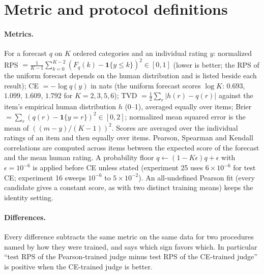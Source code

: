 \section{Metric and protocol definitions}
\label{app:protocols}

\paragraph{Metrics.}
For a forecast $q$ on $K$ ordered categories and an individual rating $y$:
normalized RPS $=\frac1{K-1}\sum_{k=0}^{K-2}(F_q(k)-\mathbf 1\{y\le k\})^2\in[0,1]$ (lower is better; the RPS of the uniform forecast depends on the human distribution and is listed beside each result);
CE $=-\log q(y)$ in nats (the uniform forecast scores $\log K$: $0.693$, $1.099$, $1.609$, $1.792$ for $K=2,3,5,6$);
TVD $=\tfrac12\sum_r|h(r)-q(r)|$ against the item's empirical human distribution $h$ (0--1), averaged equally over items;
Brier $=\sum_r(q(r)-\mathbf 1\{y=r\})^2\in[0,2]$;
normalized mean squared error is the mean of $((m-y)/(K-1))^2$.
Scores are averaged over the individual ratings of an item and then equally over items.
Pearson, Spearman and Kendall correlations are computed across items between the expected score of the forecast and the mean human rating.
A probability floor $q\leftarrow(1-K\epsilon)q+\epsilon$ with $\epsilon=10^{-6}$ is applied before CE unless stated (experiment 25 uses $6\times10^{-6}$ for test CE; experiment 16 sweeps $10^{-6}$ to $5\times10^{-2}$).
An all-undefined Pearson fit (every candidate gives a constant score, as with two distinct training means) keeps the identity setting.

\paragraph{Differences.}
Every difference subtracts the same metric on the same data for two procedures named by how they were trained, and says which sign favors which.
In particular ``test RPS of the Pearson-trained judge minus test RPS of the CE-trained judge'' is positive when the CE-trained judge is better.

